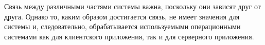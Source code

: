 Связь между различными частями системы важна, поскольку они зависят друг от друга. Однако то, каким образом достигается связь, не имеет значения для системы и, следовательно, обрабатывается используемыми операционными системами как для клиентского приложения, так и для серверного приложения.